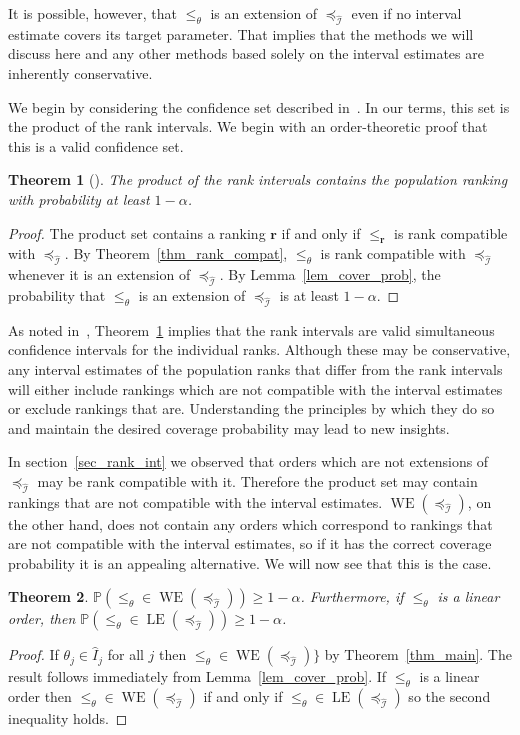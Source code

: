 \documentclass[12pt]{article}
\newcommand{\prob}[1]{\mathbb{P}(#1)}
\newcommand{\iord}{{\preceq_{\hat{\mathcal{I}}}}}
\newcommand{\pord}{{\leqslant_{\theta}}}
\newcommand{\rord}[1][\mathbf{r}]{{\leqslant_{#1}}}
\newcommand{\LE}[1]{\operatorname{LE}(#1)}
\newcommand{\WE}[1]{\operatorname{WE}(#1)}
\newtheorem{theorem}{Theorem}
\numberwithin{theorem}{section}
\begin{document}
\noindent
It is possible, however, that $\pord$ is an extension of $\iord$ even if no interval estimate covers its target parameter.  That implies that the methods we will discuss here and any other methods based solely on the interval estimates are inherently conservative.

We begin by considering the confidence set described in~\cite{klein2020jointCR}.  In our terms, this set is the product of the rank intervals.  We begin with an order-theoretic proof that this is a valid confidence set.

\begin{theorem}[\cite{klein2020jointCR}]
\label{thm_product_set}
The product of the rank intervals contains the population ranking with probability at least $1 - \alpha$.
\end{theorem}
\begin{proof}
The product set contains a ranking $\mathbf{r}$ if and only if $\rord$ is rank compatible with $\iord$.  By Theorem~\ref{thm_rank_compat}, $\pord$ is rank compatible with $\iord$ whenever it is an extension of $\iord$.  By Lemma~\ref{lem_cover_prob}, the probability that $\pord$ is an extension of $\iord$ is at least $1 - \alpha$.
\end{proof}

\noindent
As noted in~\cite{klein2020jointCR}, Theorem~\ref{thm_product_set} implies that the rank intervals are valid simultaneous confidence intervals for the individual ranks.  Although these may be conservative, any interval estimates of the population ranks that differ from the rank intervals will either include rankings which are not compatible with the interval estimates or exclude rankings that are.  Understanding the principles by which they do so and maintain the desired coverage probability may lead to new insights.

In section~\ref{sec_rank_int} we observed that orders which are not extensions of $\iord$ may be rank compatible with it.  Therefore the product set may contain rankings that are not compatible with the interval estimates.  $\WE{\iord}$, on the other hand, does not contain any orders which correspond to rankings that are not compatible with the interval estimates, so if it has the correct coverage probability it is an appealing alternative.  We will now see that this is the case.

\begin{theorem}
\label{thm_conf_set_weak_ext}
$\prob{\pord \in \WE{\iord}} \geq 1 - \alpha$.  Furthermore, if $\pord$ is a linear order, then $\prob{\pord \in \LE{\iord}} \geq 1 - \alpha$.
\end{theorem}
\begin{proof}
If $\theta_j \in \hat{I}_j$ for all $j$ then $\pord \in \WE{\iord}\}$ by Theorem~\ref{thm_main}.  The result follows immediately from Lemma~\ref{lem_cover_prob}.  If $\pord$ is a linear order then $\pord \in \WE{\iord}$ if and only if $\pord \in \LE{\iord}$ so the second inequality holds.
\end{proof}
\end{document}
